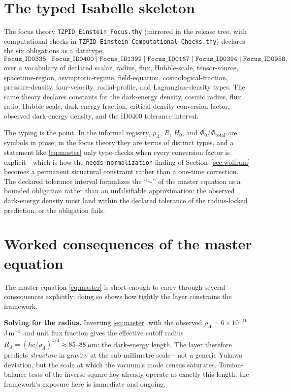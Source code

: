 \documentclass[11pt]{article}
\theoremstyle{remark}
\begin{document}
\section{The typed Isabelle skeleton}
\label{sec:isabelle}

The focus theory \texttt{TZPID\_Einstein\_Focus.thy} (mirrored in the release tree, with computational checks in \texttt{TZPID\_Einstein\_Computational\_Checks.thy}) declares the six obligations as a datatype,
\begin{equation*}
\texttt{Focus\_ID0335} \mid \texttt{Focus\_ID0400} \mid \texttt{Focus\_ID1392} \mid \texttt{Focus\_ID0167} \mid \texttt{Focus\_ID0394} \mid \texttt{Focus\_ID0958},
\end{equation*}
over a vocabulary of declared scalar, radius, flux, Hubble-scale, tensor-source, spacetime-region, asymptotic-regime, field-equation, cosmological-fraction, pressure-density, four-velocity, radial-profile, and Lagrangian-density types. The same theory declares constants for the dark-energy density, cosmic radius, flux ratio, Hubble scale, dark-energy fraction, critical-density conversion factor, observed dark-energy density, and the ID0400 tolerance interval.

The typing is the point. In the informal registry, $\rho_\Lambda$, $R$, $H_0$, and $\Phi_0/\Phi_{\mathrm{total}}$ are symbols in prose; in the focus theory they are terms of distinct types, and a statement like \eqref{eq:master} only type-checks when every conversion factor is explicit---which is how the \texttt{needs\_normalization} finding of Section~\ref{sec:wolfram} becomes a permanent structural constraint rather than a one-time correction. The declared tolerance interval formalizes the ``$\sim$'' of the master equation as a bounded obligation rather than an unfalsifiable approximation: the observed dark-energy density must land within the declared tolerance of the radius-locked prediction, or the obligation fails.

\section{Worked consequences of the master equation}
\label{sec:worked}

The master equation \eqref{eq:master} is short enough to carry through several consequences explicitly; doing so shows how tightly the layer constrains the framework.

\textbf{Solving for the radius.} Inverting \eqref{eq:master} with the observed $\rho_\Lambda = 6 \times 10^{-10}$ J\,m$^{-3}$ and unit flux fraction gives the effective cutoff radius $R_\Lambda = (\hbar c / \rho_\Lambda)^{1/4} \approx 85$--$88\ \mu$m: the dark-energy length. The layer therefore predicts \emph{structure} in gravity at the sub-millimetre scale---not a generic Yukawa deviation, but the scale at which the vacuum's mode census saturates. Torsion-balance tests of the inverse-square law already operate at exactly this length; the framework's exposure here is immediate and ongoing.
\end{document}
